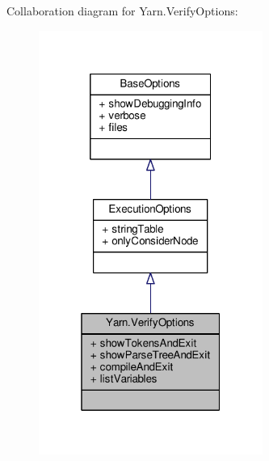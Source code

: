 Collaboration diagram for Yarn.\-Verify\-Options\-:
\nopagebreak
\begin{figure}[H]
\begin{center}
\leavevmode
\includegraphics[width=208pt]{a00652}
\end{center}
\end{figure}
